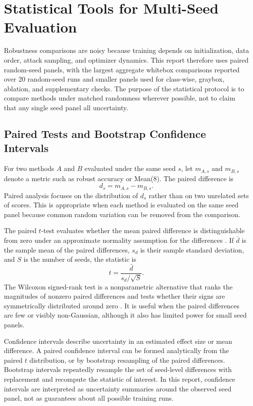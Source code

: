 \section{Statistical Tools for Multi-Seed Evaluation}

Robustness comparisons are noisy because training depends on initialization, data order, attack sampling, and optimizer dynamics. This report therefore uses paired random-seed panels, with the largest aggregate whitebox comparisons reported over 20 random-seed runs and smaller panels used for class-wise, graybox, ablation, and supplementary checks. The purpose of the statistical protocol is to compare methods under matched randomness wherever possible, not to claim that any single seed panel all uncertainty.

\subsection{Paired Tests and Bootstrap Confidence Intervals}

For two methods $A$ and $B$ evaluated under the same seed $s$, let $m_{A,s}$ and $m_{B,s}$ denote a metric such as robust accuracy or Mean(8). The paired difference is
\[
d_s=m_{A,s}-m_{B,s}.
\]
Paired analysis focuses on the distribution of $d_s$ rather than on two unrelated sets of scores. This is appropriate when each method is evaluated on the same seed panel because common random variation can be removed from the comparison.

The paired $t$-test evaluates whether the mean paired difference is distinguishable from zero under an approximate normality assumption for the differences \cite{student1908probable}. If $\bar{d}$ is the sample mean of the paired differences, $s_d$ is their sample standard deviation, and $S$ is the number of seeds, the statistic is
\[
t=\frac{\bar{d}}{s_d/\sqrt{S}}.
\]
The Wilcoxon signed-rank test is a nonparametric alternative that ranks the magnitudes of nonzero paired differences and tests whether their signs are symmetrically distributed around zero \cite{wilcoxon1945individual}. It is useful when the paired differences are few or visibly non-Gaussian, although it also has limited power for small seed panels.

Confidence intervals describe uncertainty in an estimated effect size or mean difference. A paired confidence interval can be formed analytically from the paired $t$ distribution, or by bootstrap resampling of the paired differences. Bootstrap intervals repeatedly resample the set of seed-level differences with replacement and recompute the statistic of interest. In this report, confidence intervals are interpreted as uncertainty summaries around the observed seed panel, not as guarantees about all possible training runs.


